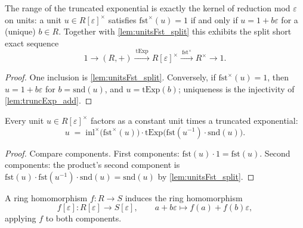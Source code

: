 \begin{theorem}
  \label{thm:truncExp_exact}
  \leanok
  The range of the truncated exponential is exactly the kernel of reduction mod
  \(\varepsilon\) on units: a unit \(u \in R[\varepsilon]^\times\) satisfies
  \(\mathrm{fst}^\times(u) = 1\) if and only if \(u = 1 + b\varepsilon\) for a (unique)
  \(b \in R\). Together with \ref{lem:unitsFst_split} this exhibits the split short
  exact sequence
  \[
    1 \longrightarrow (R, +) \xrightarrow{\ \mathrm{tExp}\ } R[\varepsilon]^\times
      \xrightarrow{\ \mathrm{fst}^\times\ } R^\times \longrightarrow 1 .
  \]
\end{theorem}
\begin{proof}
  \leanok
  One inclusion is \ref{lem:unitsFst_split}. Conversely, if
  \(\mathrm{fst}^\times(u) = 1\), then \(u = 1 + b\varepsilon\) for
  \(b = \mathrm{snd}(u)\), and \(u = \mathrm{tExp}(b)\); uniqueness is the injectivity
  of \ref{lem:truncExp_add}.
\end{proof}

\begin{lemma}
  \label{lem:unit_decomposition}
  \leanok
  Every unit \(u \in R[\varepsilon]^\times\) factors as a constant unit times a
  truncated exponential:
  \[
    u \;=\; \mathrm{inl}^\times\bigl(\mathrm{fst}^\times(u)\bigr)
      \cdot \mathrm{tExp}\bigl(\mathrm{fst}(u^{-1}) \cdot \mathrm{snd}(u)\bigr).
  \]
\end{lemma}
\begin{proof}
  \leanok
  Compare components. First components: \(\mathrm{fst}(u) \cdot 1 = \mathrm{fst}(u)\).
  Second components: the product's second component is
  \(\mathrm{fst}(u) \cdot \mathrm{fst}(u^{-1}) \cdot \mathrm{snd}(u) =
  \mathrm{snd}(u)\) by \ref{lem:unitsFst_split}.
\end{proof}

\begin{definition}
  \label{def:dualNumber_map}
  \leanok
  A ring homomorphism \(f : R \to S\) induces the ring homomorphism
  \[
    f[\varepsilon] : R[\varepsilon] \to S[\varepsilon], \qquad
    a + b\varepsilon \longmapsto f(a) + f(b)\varepsilon,
  \]
  applying \(f\) to both components.
\end{definition}

